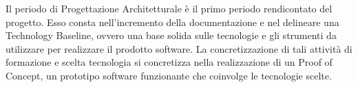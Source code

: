 Il periodo di Progettazione Architetturale è il primo periodo rendicontato del progetto. Esso consta nell'incremento della documentazione e nel delineare una Technology Baseline, ovvero una base solida sulle tecnologie e gli strumenti da utilizzare per realizzare il prodotto software. La concretizzazione di tali attività di formazione e scelta tecnologia si concretizza nella realizzazione di un Proof of Concept, un prototipo software funzionante che coinvolge le tecnologie scelte.